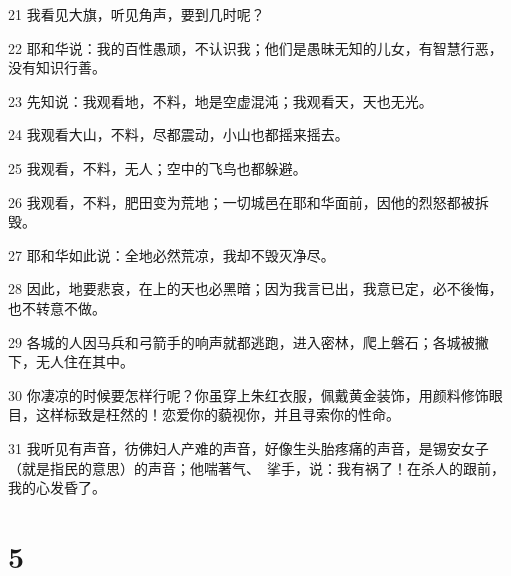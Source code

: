 \par 21 我看见大旗，听见角声，要到几时呢？
\par 22 耶和华说：我的百性愚顽，不认识我；他们是愚昧无知的儿女，有智慧行恶，没有知识行善。
\par 23 先知说：我观看地，不料，地是空虚混沌；我观看天，天也无光。
\par 24 我观看大山，不料，尽都震动，小山也都摇来摇去。
\par 25 我观看，不料，无人；空中的飞鸟也都躲避。
\par 26 我观看，不料，肥田变为荒地；一切城邑在耶和华面前，因他的烈怒都被拆毁。
\par 27 耶和华如此说：全地必然荒凉，我却不毁灭净尽。
\par 28 因此，地要悲哀，在上的天也必黑暗；因为我言已出，我意已定，必不後悔，也不转意不做。
\par 29 各城的人因马兵和弓箭手的响声就都逃跑，进入密林，爬上磐石；各城被撇下，无人住在其中。
\par 30 你凄凉的时候要怎样行呢？你虽穿上朱红衣服，佩戴黄金装饰，用颜料修饰眼目，这样标致是枉然的！恋爱你的藐视你，并且寻索你的性命。
\par 31 我听见有声音，彷佛妇人产难的声音，好像生头胎疼痛的声音，是锡安女子（就是指民的意思）的声音；他喘著气、　挲手，说：我有祸了！在杀人的跟前，我的心发昏了。

\chapter{5}

